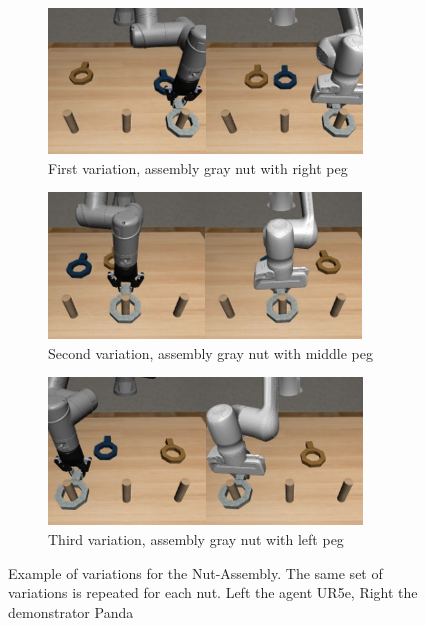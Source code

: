 \begin{figure}[hbt!]
    \centering
    \begin{subfigure}{0.3\textwidth}
        \centering
        \includegraphics[width=\textwidth]{Figures/images/nut_assembly/task_1.png}
        \caption{First variation, assembly gray nut with right peg}
        \label{fig:first_variation_nut}
    \end{subfigure}
    \hspace{10px}
    \begin{subfigure}{0.3\textwidth}
        \centering
        \includegraphics[width=\textwidth]{Figures/images/nut_assembly/task_2.png}
        \caption{Second variation, assembly gray nut with middle peg}
        \label{fig:second_variation_nut}
    \end{subfigure}
    \hspace{10px}
    \begin{subfigure}{0.3\textwidth}
        \centering
        \includegraphics[width=\textwidth]{Figures/images/nut_assembly/task_3.png}
        \caption{Third variation, assembly gray nut with left peg}
        \label{fig:third_variation_nut}
    \end{subfigure}
    \caption{Example of variations for the Nut-Assembly. The same set of variations is repeated for each nut. Left the agent UR5e, Right the demonstrator Panda}
    \label{fig:examples_of_variations_for_nut_assembly}
\end{figure}